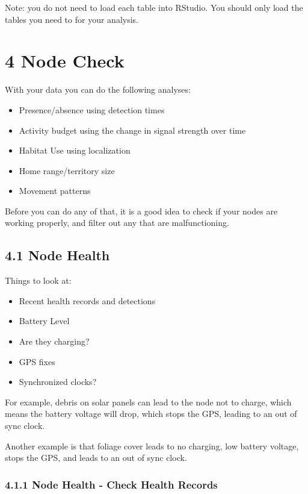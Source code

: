 \documentclass[
]{book}
\providecommand{\tightlist}{%
  \setlength{\itemsep}{0pt}\setlength{\parskip}{0pt}}
\begin{document}
Note: you do not need to load each table into RStudio. You should only load the tables you need to for your analysis.

\chapter{4 Node Check}\label{node-check}

With your data you can do the following analyses:

\begin{itemize}
\tightlist
\item
  Presence/absence using detection times
\item
  Activity budget using the change in signal strength over time
\item
  Habitat Use using localization
\item
  Home range/territory size
\item
  Movement patterns
\end{itemize}

Before you can do any of that, it is a good idea to check if your nodes are working properly, and filter out any that are malfunctioning.

\section{4.1 Node Health}\label{node-health}

Things to look at:

\begin{itemize}
\tightlist
\item
  Recent health records and detections
\item
  Battery Level
\item
  Are they charging?
\item
  GPS fixes
\item
  Synchronized clocks?
\end{itemize}

For example, debris on solar panels can lead to the node not to charge, which means the battery voltage will drop, which stops the GPS, leading to an out of sync clock.

Another example is that foliage cover leads to no charging, low battery voltage, stops the GPS, and leads to an out of sync clock.

\subsection{4.1.1 Node Health - Check Health Records}\label{node-health---check-health-records}
\end{document}
